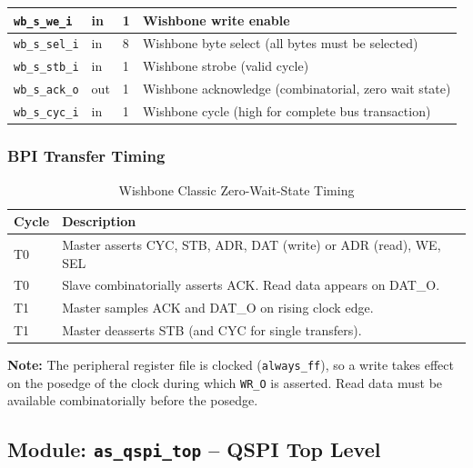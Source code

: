 \begin{table}[H]
\begin{tabularx}{\textwidth}{|l|l|l|X|}
  \hline
  \texttt{wb\_s\_we\_i}       & in  & 1  & Wishbone write enable \\
  \hline
  \texttt{wb\_s\_sel\_i}      & in  & 8  & Wishbone byte select (all bytes must be selected) \\
  \hline
  \texttt{wb\_s\_stb\_i}      & in  & 1  & Wishbone strobe (valid cycle) \\
  \hline
  \texttt{wb\_s\_ack\_o}      & out & 1  & Wishbone acknowledge (combinatorial, zero wait state) \\
  \hline
  \texttt{wb\_s\_cyc\_i}      & in  & 1  & Wishbone cycle (high for complete bus transaction) \\
  \hline
\end{tabularx}
\end{table}

\subsubsection{BPI Transfer Timing}

\begin{table}[H]
\caption{Wishbone Classic Zero-Wait-State Timing}
\label{tab:asbpi_timing}
\centering
\begin{tabularx}{\textwidth}{|l|X|}
  \hline
  Cycle & Description \\
  \hline\hline
  T0 & Master asserts CYC, STB, ADR, DAT (write) or ADR (read), WE, SEL \\
  \hline
  T0 & Slave combinatorially asserts ACK. Read data appears on DAT\_O. \\
  \hline
  T1 & Master samples ACK and DAT\_O on rising clock edge. \\
  \hline
  T1 & Master deasserts STB (and CYC for single transfers). \\
  \hline
\end{tabularx}
\end{table}

\textbf{Note:} The peripheral register file is clocked (\texttt{always\_ff}),
so a write takes effect on the posedge of the clock during which \texttt{WR\_O}
is asserted. Read data must be available combinatorially before the posedge.

\subsection{Module: \texttt{as\_qspi\_top} -- QSPI Top Level}
\label{subsec:asqspi_top}

